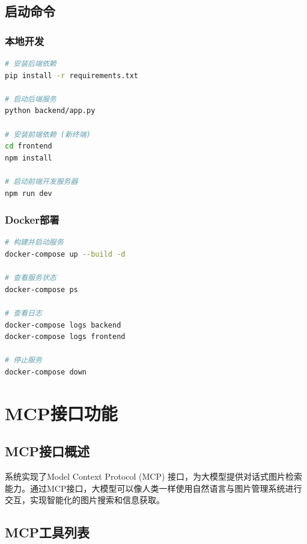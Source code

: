 \documentclass[cs4size,a4paper]{ctexart}
\numberwithin{equation}{section}
\numberwithin{table}{section}
\numberwithin{figure}{section}
\begin{document}
\subsection{启动命令}

\subsubsection{本地开发}

\begin{lstlisting}[language=Bash,caption=本地启动命令]
# 安装后端依赖
pip install -r requirements.txt

# 启动后端服务
python backend/app.py

# 安装前端依赖 (新终端)
cd frontend
npm install

# 启动前端开发服务器
npm run dev
\end{lstlisting}

\subsubsection{Docker部署}

\begin{lstlisting}[language=Bash,caption=Docker部署命令]
# 构建并启动服务
docker-compose up --build -d

# 查看服务状态
docker-compose ps

# 查看日志
docker-compose logs backend
docker-compose logs frontend

# 停止服务
docker-compose down
\end{lstlisting}

\newpage

\section{MCP接口功能}

\subsection{MCP接口概述}

系统实现了Model Context Protocol (MCP) 接口，为大模型提供对话式图片检索能力。通过MCP接口，大模型可以像人类一样使用自然语言与图片管理系统进行交互，实现智能化的图片搜索和信息获取。

\subsection{MCP工具列表}
\end{document}

